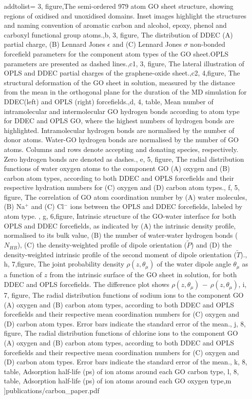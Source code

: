      addtolist={
     3, figure,{The semi-ordered 979 atom GO sheet structure, showing regions of oxidised and unoxidised domains. Inset images highlight the structures and naming convention of aromatic carbon and alcohol, epoxy, phenol and carboxyl functional group atoms.},b,
     3, figure, {The distribution of DDEC (A) partial charge, (B) Lennard Jones $\epsilon$ and (C) Lennard Jones $\sigma$ non-bonded forcefield parameters for the component atom types of the GO sheet.OPLS parameters are presented as dashed lines.},c1,
     3, figure, {The lateral illustration of OPLS and DDEC partial charges of the graphene-oxide sheet.},c2,
     4,figure, {The structural deformation of the GO sheet in solution, measured by the distance from the mean in the orthogonal plane for the duration of the MD simulation for DDEC(left) and OPLS (right) forcefields.},d,
     4, table, {Mean number of intramolecular and intermolecular GO hydrogen bonds according to atom type for DDEC and OPLS GO, where the highest numbers of hydrogen bonds are highlighted. Intramolecular hydrogen bonds are normalised by the number of donor atoms. Water-GO hydrogen bonds are normalised by the number of GO atoms. Columns and rows denote accepting and donating species, respectively. Zero hydrogen bonds are denoted as dashes.}, e,
     5, figure, {The radial distribution functions of water oxygen atoms to the component GO (A) oxygen and (B) carbon atom types, according to both DDEC and OPLS forcefields and their respective hydration numbers for (C) oxygen and (D) carbon atom types.}, f,
     5, figure, {The correlation of GO atom coordination number by (A) water molecules, (B) Na$^{+}$ and (C) Cl$^{-}$ ions between the OPLS and DDEC forcefields, labeled by atom type. }, g,
     6,figure, {Intrinsic structure of the GO-water interface for both OPLS and DDEC forcefields, as indicated by (A) the intrinsic density profile, normalised to its bulk value, (B) the number of water-water hydrogen bonds ($N_{HB}$), (C) the density-weighted profile of dipole orientation ($\tilde{P}$) and (D) the density-weighted intrinsic profile of the second moment of dipole orientation ($\tilde{T}$).}, h,
     7,figure, {The joint probability density $\rho(z, \theta_{\mu})$ of the water dipole angle $\theta_{\mu}$ as a function of $z$ from the intrinsic surface of the GO sheet in solution, for both DDEC and OPLS forcefields. The difference plot shows $\rho(z, \theta_{\mu})\,-\, \rho(z, \theta_{\mu})$}, i,
     7, figure, {The radial distribution functions of sodium ions to the component GO (A) oxygen and (B) carbon atom types, according to both DDEC and OPLS forcefields and their respective mean coordination numbers for (C) oxygen and (D) carbon atom types. Error bars indicate the standard error of the mean.}, j,
     8, figure, {The radial distribution functions of chlorine ions to the component GO (A) oxygen and (B) carbon atom types, according to both DDEC and OPLS forcefields and their respective mean coordination numbers for (C) oxygen and (D) carbon atom types. Error bars indicate the standard error of the mean.}, k,
     8, table, {Adsorption half-life (ps) of ion atoms around each GO carbon type}, l,
     8, table, {Adsorption half-life (ps) of ion atoms around each GO oxygen type},m}
    ]{publications/carbon_paper.pdf}      

